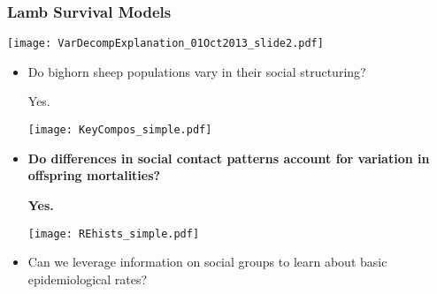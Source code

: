 \documentclass[fleqn,xcolor=table]{beamer}
\begin{document}
\begin{frame}[t]
	\frametitle{\color{darkred} Lamb Survival Models}
	\vspace{.2in}

	\texttt{[image: VarDecompExplanation\_01Oct2013\_slide2.pdf]}
\end{frame}


{
\begin{frame}[t]
	\begin{itemize}
		\item[] \color{navy} Do bighorn sheep populations vary in their social
			structuring?
			\vspace{.1in}
			
			\color{darkred} Yes.

			\texttt{[image: KeyCompos\_simple.pdf]}
			\vspace{.1in}
		\item[] \color{navy} \textbf{Do differences in social contact patterns account for variation in
			offspring mortalities?}
			\vspace{.1in}
		
			\color{darkred} \textbf{Yes.}

			\texttt{[image: REhists\_simple.pdf]}
			\vspace{.1in}
		\item[] \color{navy} Can we leverage information on social groups to learn
			about basic epidemiological rates?
	\end{itemize}
\end{frame}
}
%
%
%
%
\end{document}
